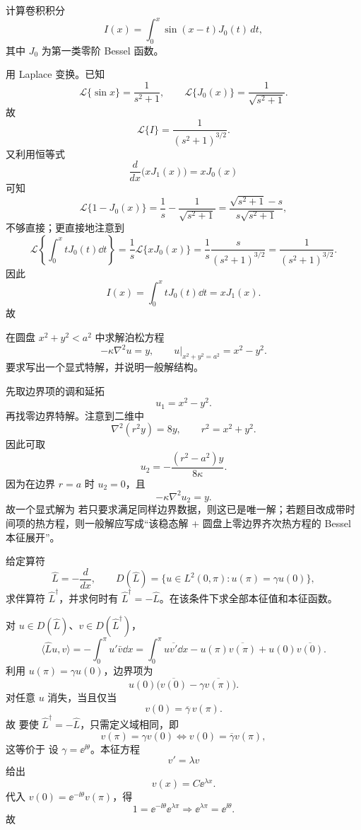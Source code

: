 ﻿


\begin{question}
计算卷积积分
\[
I(x)=\int_0^x \sin(x-t)J_0(t)\,dt,
\]
其中 $J_0$ 为第一类零阶 Bessel 函数。
\begin{solution}

用 Laplace 变换。已知
\[
\mathcal L\{\sin x\}=\frac{1}{s^2+1},\qquad \mathcal L\{J_0(x)\}=\frac{1}{\sqrt{s^2+1}}.
\]
故
\[
\mathcal L\{I\}=\frac{1}{(s^2+1)^{3/2}}.
\]
又利用恒等式
\[
\frac{d}{dx}\bigl(xJ_1(x)\bigr)=xJ_0(x)
\]
可知
\[
\mathcal L\{1-J_0(x)\}=\frac{1}{s}-\frac{1}{\sqrt{s^2+1}}
=\frac{\sqrt{s^2+1}-s}{s\sqrt{s^2+1}},
\]
不够直接；更直接地注意到
\[
\mathcal L\left\{\int_0^x tJ_0(t)\dd{t}\right\}=\frac1s\mathcal L\{xJ_0(x)\}=\frac1s\frac{s}{(s^2+1)^{3/2}}=\frac{1}{(s^2+1)^{3/2}}.
\]
因此
\[
I(x)=\int_0^x tJ_0(t)\dd{t}=xJ_1(x).
\]
故
\end{solution}
\end{question}

\begin{question}
在圆盘 $x^2+y^2<a^2$ 中求解泊松方程
\[
-\kappa\nabla^2u=y,
\qquad u|_{x^2+y^2=a^2}=x^2-y^2.
\]
要求写出一个显式特解，并说明一般解结构。
\begin{solution}

先取边界项的调和延拓
\[
 u_1=x^2-y^2.
\]
再找零边界特解。注意到二维中
\[
\nabla^2(r^2y)=8y,
\qquad r^2=x^2+y^2.
\]
因此可取
\[
 u_2=-\frac{(r^2-a^2)y}{8\kappa}.
\]
因为在边界 $r=a$ 时 $u_2=0$，且
\[
-\kappa\nabla^2u_2=y.
\]
故一个显式解为
若只要求满足同样边界数据，则这已是唯一解；若题目改成带时间项的热方程，则一般解应写成“该稳态解 $+$ 圆盘上零边界齐次热方程的 Bessel 本征展开”。
\end{solution}
\end{question}

\begin{question}
给定算符
\[
\hat L=-\frac{d}{dx},
\qquad D(\hat L)=\{u\in L^2(0,\pi):u(\pi)=\gamma u(0)\},
\]
求伴算符 $\hat L^\dagger$，并求何时有 $\hat L^\dagger=-\hat L$。在该条件下求全部本征值和本征函数。
\begin{solution}

对 $u\in D(\hat L)$、$v\in D(\hat L^\dagger)$，
\[
\langle \hat Lu,v\rangle=-\int_0^{\pi}u'\bar v\dd{x}=
\int_0^{\pi}u\overline{v'}\dd{x}-u(\pi)\overline{v(\pi)}+u(0)\overline{v(0)}.
\]
利用 $u(\pi)=\gamma u(0)$，边界项为
\[
u(0)\bigl(\overline{v(0)}-\gamma\overline{v(\pi)}\bigr).
\]
对任意 $u$ 消失，当且仅当
\[
 v(0)=\overline\gamma\,v(\pi).
\]
故
要使 $\hat L^\dagger=-\hat L$，只需定义域相同，即
\[
 v(\pi)=\gamma v(0)\iff v(0)=\overline\gamma v(\pi),
\]
这等价于
设 $\gamma=\ee^{\ii\theta}$。本征方程
\[
 v'=\lambda v
\]
给出
\[
  v(x)=C\ee^{\lambda x}.
\]
代入 $v(0)=\ee^{-\ii\theta}v(\pi)$，得
\[
 1=\ee^{-\ii\theta}\ee^{\lambda\pi}\Longrightarrow \ee^{\lambda\pi}=\ee^{\ii\theta}.
\]
故
\end{solution}
\end{question}

